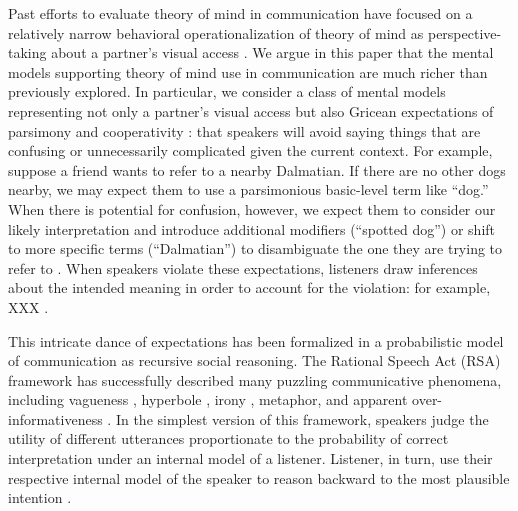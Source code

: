 \documentclass[manuscript]{stjour}
\begin{document}
Past efforts to evaluate theory of mind in communication have focused on a relatively narrow behavioral operationalization of theory of mind as perspective-taking about a partner's visual access \cite{KeysarBarr___Brauner00_TakingPerspective, KeysarLinBarr03_LimitsOnTheoryOfMindUse, LinKeysarEpley10_ReflexivelyMindblind}. 
We argue in this paper that the mental models supporting theory of mind use in communication are much richer than previously explored. 
In particular, we consider a class of mental models representing not only a partner's visual access but also Gricean expectations of parsimony and cooperativity \cite{Grice75_LogicConversation}: that speakers will avoid saying things that are confusing or unnecessarily complicated given the current context. 
For example, suppose a friend wants to refer to a nearby Dalmatian. 
If there are no other dogs nearby, we may expect them to use a parsimonious basic-level term like ``dog.''
When there is potential for confusion, however, we expect them to consider our likely interpretation and introduce additional modifiers (``spotted dog'') or shift to more specific terms (``Dalmatian'') to disambiguate the one they are trying to refer to \cite{BrennanClark96_ConceptualPactsConversation, VanDeemter16_ComputationalModelsOfReferring, GrafEtAl16_BasicLevel}. 
When speakers violate these expectations, listeners draw inferences about the intended meaning in order to account for the violation: for example, XXX \cite{XXX, BrehenyKatsosWilliams06_ImplicaturesOnline, StillerGoodmanFrank15_AdHocImplicature}. 

This intricate dance of expectations has been formalized in a probabilistic model of communication as recursive social reasoning. The Rational Speech Act (RSA) framework has successfully described many puzzling communicative phenomena, including vagueness \cite{Lassiter}, hyperbole \cite{Kao}, irony \cite{}, metaphor, and apparent over-informativeness \cite{Judith}. In the simplest version of this framework, speakers judge the utility of different utterances proportionate to the probability of correct interpretation under an internal model of a listener. Listener, in turn, use their respective internal model of the speaker to reason backward to the most plausible intention \cite{Grice75_LogicConversation,Clark96_UsingLanguage,GoodmanFrank16_RSATiCSFrankGoodman12_PragmaticReasoningLanguageGames, GoodmanStuhlmuller13_KnowledgeImplicature}. 
\end{document}
